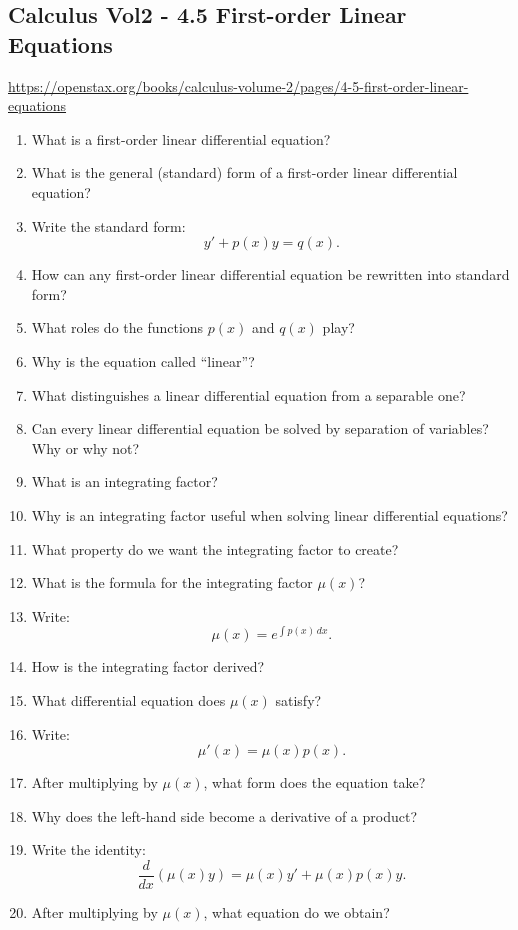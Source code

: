 \subsection{Calculus Vol2 - 4.5 First-order Linear Equations}

\url{https://openstax.org/books/calculus-volume-2/pages/4-5-first-order-linear-equations}

\begin{enumerate}
  \item What is a first-order linear differential equation?
  \item What is the general (standard) form of a first-order linear differential equation?
  \item Write the standard form:
    \[
      y' + p(x)y = q(x).
    \]
  \item How can any first-order linear differential equation be rewritten into standard form?
  \item What roles do the functions $p(x)$ and $q(x)$ play?
  \item Why is the equation called ``linear''?
  \item What distinguishes a linear differential equation from a separable one?
  \item Can every linear differential equation be solved by separation of variables? Why or why not?
  \item What is an integrating factor?
  \item Why is an integrating factor useful when solving linear differential equations?
  \item What property do we want the integrating factor to create?
  \item What is the formula for the integrating factor $\mu(x)$?
  \item Write:
    \[
      \mu(x) = e^{\int p(x)\,dx}.
    \]
  \item How is the integrating factor derived?
  \item What differential equation does $\mu(x)$ satisfy?
  \item Write:
    \[
      \mu'(x) = \mu(x)p(x).
    \]
  \item After multiplying by $\mu(x)$, what form does the equation take?
  \item Why does the left-hand side become a derivative of a product?
  \item Write the identity:
    \[
      \frac{d}{dx}(\mu(x)y) = \mu(x)y' + \mu(x)p(x)y.
    \]
  \item After multiplying by $\mu(x)$, what equation do we obtain?

\end{enumerate}
